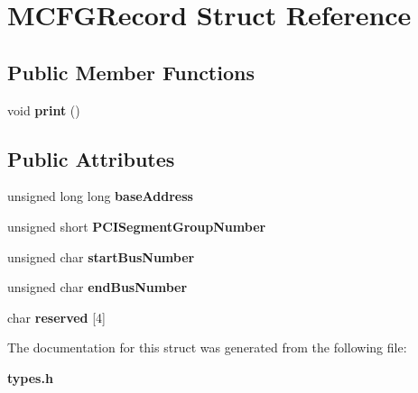 \section{M\+C\+F\+G\+Record Struct Reference}
\label{structMCFGRecord}
\subsection*{Public Member Functions}
\begin{DoxyCompactItemize}
\item 
\mbox{\label{structMCFGRecord_a4b954297f9dd2db580af3305dc2c1200}} 
void {\bfseries print} ()
\end{DoxyCompactItemize}
\subsection*{Public Attributes}
\begin{DoxyCompactItemize}
\item 
\mbox{\label{structMCFGRecord_ab80de5ed728d89f1bd60647e0e909289}} 
unsigned long long {\bfseries base\+Address}
\item 
\mbox{\label{structMCFGRecord_a2ead77d33416e9f9a8607c7bdc9a3aa4}} 
unsigned short {\bfseries P\+C\+I\+Segment\+Group\+Number}
\item 
\mbox{\label{structMCFGRecord_a88a45ddf628776154cb5ed02b384061d}} 
unsigned char {\bfseries start\+Bus\+Number}
\item 
\mbox{\label{structMCFGRecord_a39692440cf50265f71b638d433a7ce37}} 
unsigned char {\bfseries end\+Bus\+Number}
\item 
\mbox{\label{structMCFGRecord_a549591813ff09495f6ee59cb3288f130}} 
char {\bfseries reserved} [4]
\end{DoxyCompactItemize}


The documentation for this struct was generated from the following file\+:\begin{DoxyCompactItemize}
\item 
\textbf{ types.\+h}\end{DoxyCompactItemize}
